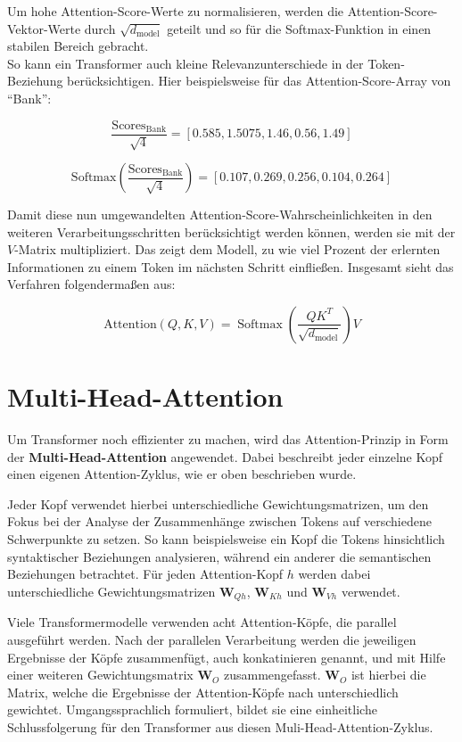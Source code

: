 Um hohe Attention-Score-Werte zu normalisieren, werden die Attention-Score-Vektor-Werte durch \( \sqrt{d_{\text{model}}} \) geteilt und so für die Softmax-Funktion in einen stabilen Bereich gebracht. \\
So kann ein Transformer auch kleine Relevanzunterschiede in der Token-Beziehung berücksichtigen.
Hier beispielsweise für das Attention-Score-Array von \enquote{Bank}:

\[
\frac{\text{Scores}_{\text{Bank}}}{\sqrt{4}} = [0.585, 1.5075, 1.46, 0.56, 1.49]
\]

\[
\text{Softmax}\left(\frac{\text{Scores}_{\text{Bank}}}{\sqrt{4}}\right) = [0.107, 0.269, 0.256, 0.104, 0.264]
\]

Damit diese nun umgewandelten Attention-Score-Wahrscheinlichkeiten in den weiteren Verarbeitungsschritten berücksichtigt werden können, werden sie mit der \( V \)-Matrix multipliziert. 
Das zeigt dem Modell, zu wie viel Prozent der erlernten Informationen zu einem Token im nächsten Schritt einfließen.
Insgesamt sieht das Verfahren folgendermaßen aus:

\[
\text{Attention}(Q, K, V) = \operatorname{Softmax}\left(\frac{QK^T}{\sqrt{d_{\text{model}}}}\right) V
\]



\section{Multi-Head-Attention}

Um Transformer noch effizienter zu machen, wird das Attention-Prinzip in Form der \textbf{Multi-Head-Attention} angewendet. 
Dabei beschreibt jeder einzelne Kopf einen eigenen Attention-Zyklus, wie er oben beschrieben wurde.

Jeder Kopf verwendet hierbei unterschiedliche Gewichtungsmatrizen, um den Fokus bei der Analyse der Zusammenhänge zwischen Tokens auf verschiedene Schwerpunkte zu setzen. 
So kann beispielsweise ein Kopf die Tokens hinsichtlich syntaktischer Beziehungen analysieren, während ein anderer die semantischen Beziehungen betrachtet. 
Für jeden Attention-Kopf \( h \) werden dabei unterschiedliche Gewichtungsmatrizen \( \mathbf{W}_{Qh} \), \( \mathbf{W}_{Kh} \) und \( \mathbf{W}_{Vh} \) verwendet.

Viele Transformermodelle verwenden acht Attention-Köpfe, die parallel ausgeführt werden.
Nach der parallelen Verarbeitung werden die jeweiligen Ergebnisse der Köpfe zusammenfügt, auch konkatinieren genannt, und mit Hilfe einer weiteren Gewichtungsmatrix \( \mathbf{W}_{O} \) zusammengefasst.
\( \mathbf{W}_{O} \) ist hierbei die Matrix, welche die Ergebnisse der Attention-Köpfe nach unterschiedlich gewichtet.
Umgangssprachlich formuliert, bildet sie eine einheitliche Schlussfolgerung für den Transformer aus diesen Muli-Head-Attention-Zyklus.

